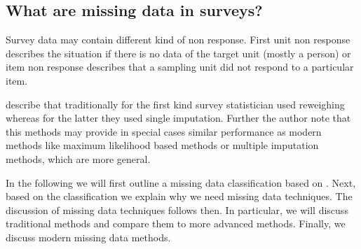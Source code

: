 \subsection{What are missing data in surveys?}
Survey data may contain different kind of non response. First unit non response describes the situation if there is no data of the target unit (mostly a person) or item non response describes that a sampling unit did not respond to a particular item. \par
\cite{schafer2002missing} describe that traditionally for the first kind survey statistician used reweighing whereas for the latter they used single imputation.
 Further the author note that this methods may provide in special cases similar performance as modern methods like maximum likelihood based methods or multiple imputation methods, which are more general.  \par
In the following we will first outline a missing data classification based on \cite{rubin1976}. 
Next, based on the classification we explain why we need missing data techniques. 
The discussion of missing data techniques follows then. In particular, we will discuss traditional methods and compare them to more advanced methods. 
Finally, we discuss modern missing data methods. \par

